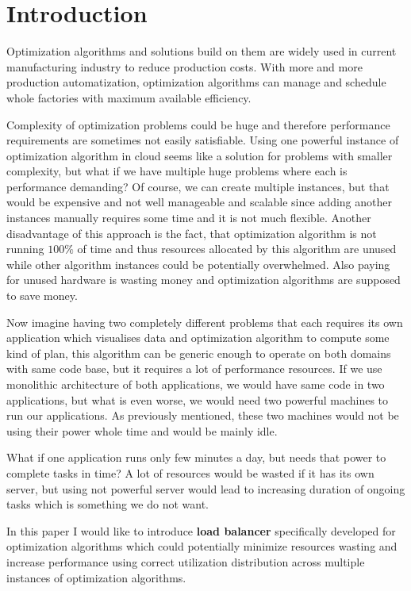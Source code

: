 
\chapter{Introduction}\label{ch:introduction}
Optimization algorithms and solutions build on them are widely used in current manufacturing industry to reduce production costs.
With more and more production automatization, optimization algorithms can manage and schedule whole factories with maximum available efficiency.

Complexity of optimization problems could be huge and therefore performance requirements are sometimes not easily satisfiable.
Using one powerful instance of optimization algorithm in cloud seems like a solution for problems with smaller complexity,
but what if we have multiple huge problems where each is performance demanding?
Of course, we can create multiple instances, but that would be expensive and not well manageable and scalable
since adding another instances manually requires some time and it is not much flexible.
Another disadvantage of this approach is the fact, that optimization algorithm is not running $100\%$ of time
and thus resources allocated by this algorithm are unused while other algorithm instances could be potentially overwhelmed.
Also paying for unused hardware is wasting money and optimization algorithms are supposed to save money.

Now imagine having two completely different problems that each requires its own application which visualises data
and optimization algorithm to compute some kind of plan,
this algorithm can be generic enough to operate on both domains with same code base, but it requires a lot of performance resources.
If we use monolithic architecture of both applications,
we would have same code in two applications,
but what is even worse, we would need two powerful machines to run our applications.
As previously mentioned, these two machines would not be using their power whole time and would be mainly idle.

What if one application runs only few minutes a day, but needs that power to complete tasks in time?
A lot of resources would be wasted if it has its own server,
but using not powerful server would lead to increasing duration of ongoing tasks which is something we do not want.

In this paper I would like to introduce \textbf{load balancer} specifically developed for optimization algorithms
which could potentially minimize resources wasting and increase performance using correct utilization distribution across
multiple instances of optimization algorithms.


